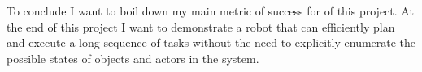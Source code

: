 \documentclass[letterpaper, 10 pt, conference]{ieeeconf}  %
\begin{document}
To conclude I want to boil down my main metric of success for of this project. At the end of this project I want to demonstrate a robot that can efficiently plan and execute a long sequence of tasks without the need to explicitly enumerate the possible states of objects and actors in the system.



\addtolength{\textheight}{-1cm}   %





\end{document}

